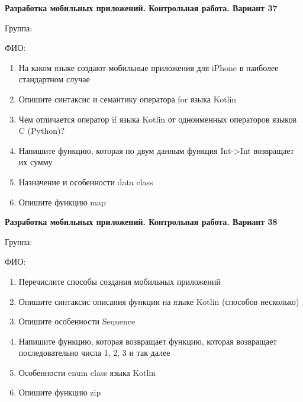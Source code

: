 \documentclass[12pt]{article}
\begin{document}
\newpage\begin{minipage}{\textwidth}
\textbf{Разработка мобильных приложений. Контрольная работа. Вариант 37}

Группа: \underline{\hspace{3cm}}

ФИО: \underline{\hspace{10cm}}

\begin{enumerate}
\item На каком языке создают мобильные приложения для iPhone в наиболее стандартном случае
\item Опишите синтаксис и семантику оператора for языка Kotlin
\item Чем отличается оператор if языка Kotlin от одноименных операторов языков C (Python)?
\item Напишите функцию, которая по двум данным функция Int->Int возвращает их сумму
\item Назначение и особенности data class
\item Опишите функцию map

\end{enumerate}
\end{minipage}

\newpage\begin{minipage}{\textwidth}
\textbf{Разработка мобильных приложений. Контрольная работа. Вариант 38}

Группа: \underline{\hspace{3cm}}

ФИО: \underline{\hspace{10cm}}

\begin{enumerate}
\item Перечислите способы создания мобильных приложений
\item Опишите синтаксис описания функции на языке Kotlin (способов несколько)
\item Опишите особенности Sequence
\item Напишите функцию, которая возвращает функцию, которая возвращает последовательно числа 1, 2, 3 и так далее
\item Особенности enum class языка Kotlin
\item Опишите функцию zip

\end{enumerate}
\end{minipage}
\end{document}
